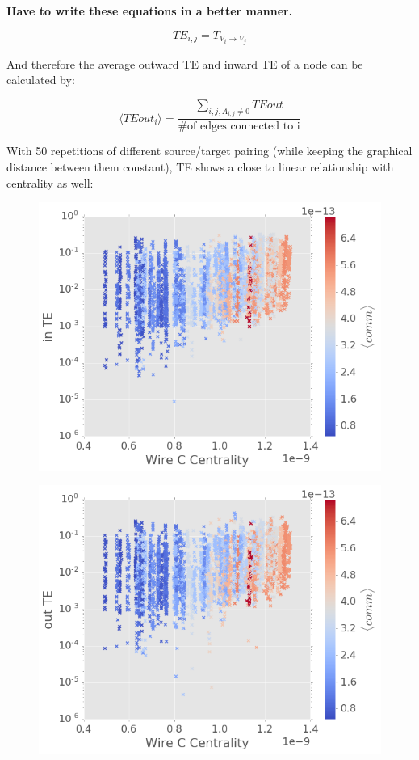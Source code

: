 \documentclass[%
 reprint,
 amsmath,amssymb,
 aps,
]{revtex4-2}
\begin{document}
\textbf{Have to write these equations in a better manner.}

\begin{equation}
TE_{i,j} = T_{V_i \rightarrow V_j}
\end{equation}

And therefore the average outward TE and inward TE of a node can be calculated by:

\begin{equation}
\langle TEout_i \rangle = \frac{\sum \limits_{i,j, A_{i,j} \neq 0} TEout}{\text{\# of edges connected to i}}
\end{equation}

With 50 repetitions of different source/target pairing (while keeping the graphical distance between them constant), TE shows a close to linear relationship with centrality as well:

\begin{figure}[h]
	\centering
	\includegraphics[width=1\linewidth]{figure/in_TE}
	\caption{}
	\label{fig:in_te}
\end{figure}

\begin{figure}[h]
	\centering
	\includegraphics[width=1\linewidth]{figure/out_TE}
	\caption{}
	\label{fig:out_te}
\end{figure}
\end{document}
